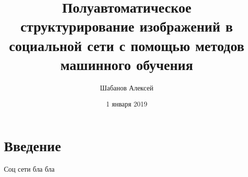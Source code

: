 \documentclass{article}
\title{Полуавтоматическое структурирование изображений в социальной сети с помощью методов машинного обучения}
\author{Шабанов Алексей}
\date{1 января 2019}
\begin{document}
\maketitle

\section{Введение}

Соц сети бла бла 
\end{document}
